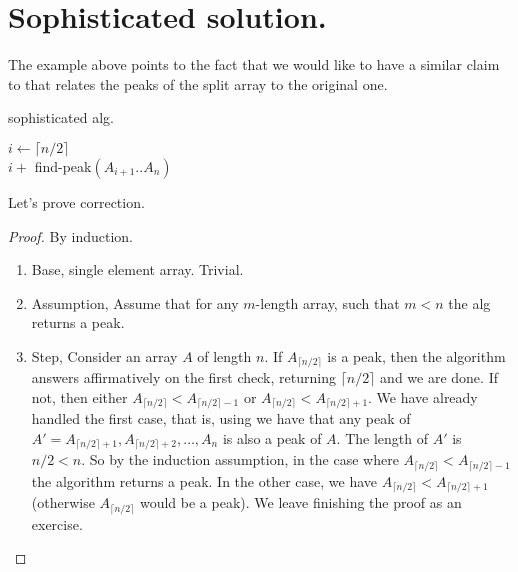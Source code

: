 \section{Sophisticated solution.}
The example above points to the fact that we would like to have a similar claim to  that relates the peaks of the split array to the original one.  
\begin{algorithm}
\caption{sophisticated alg.}
$ i \leftarrow  \lceil n/2 \rceil $\\
         { 
          \Return $i + $ find-peak$\left(A_{i+1}..A_{n}\right)$
        }
\end{algorithm}
Let's prove correction.
\begin{proof}
  By induction. 
\begin{enumerate}
  \item Base, single element array. Trivial. 
  \item Assumption, Assume that for any $m$-length array, such that $m<n$ the alg returns a peak. 
  \item Step, Consider an array $A$ of length $n$. If $A_{\lceil n/2 \rceil}$ is a peak, then the algorithm answers affirmatively on the first check, returning $\lceil n/2 \rceil$ and we are done. If not, then either $A_{\lceil n/2 \rceil} < A_{\lceil n/2 \rceil - 1}$ or $A_{\lceil n/2 \rceil} < A_{\lceil n/2 \rceil + 1}$. We have already handled the first case, that is, using  we have that any peak of $A' = A_{\lceil n/2 \rceil + 1}, A_{\lceil n/2 \rceil + 2}, \dots, A_n$ is also a peak of $A$. The length of $A'$ is $n/2 < n$. So by the induction assumption, in the case where $A_{\lceil n/2 \rceil} < A_{\lceil n/2 \rceil - 1}$ the algorithm returns a peak. In the other case, we have $A_{\lceil n/2 \rceil} < A_{\lceil n/2 \rceil + 1}$ (otherwise $A_{\lceil n/2 \rceil}$ would be a peak). We leave finishing the proof as an exercise.
\end{enumerate}

\end{proof}


